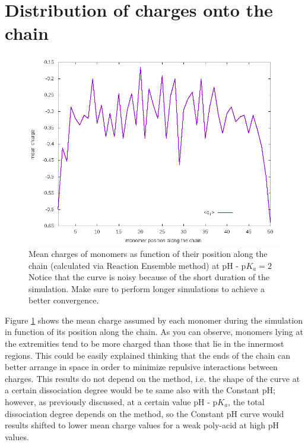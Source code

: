 \documentclass[
a4paper,                        %
11pt,                           %
twoside,                        %
footsepline,                    %
headsepline,                    %
headexclude,                    %
footexclude,                    %
pagesize,                       %
]{scrartcl}
\begin{document}
\section{Distribution of charges onto the chain}

\begin{figure}[h]
	\centering
	\includegraphics[scale=0.5]{figures/qdistrib.png}
	\caption{Mean charges of monomers as function of their position along the chain (calculated via Reaction Ensemble method) at $\text{pH - p}K_a = 2$ Notice that the curve is noisy because of the short duration of the simulation. Make sure to perform longer simulations to achieve a better convergence.}
	\label{qdistrib}
\end{figure}
Figure \ref{qdistrib} shows the mean charge assumed by each monomer during the simulation in function of its position along the chain. As you can observe, monomers lying at the extremities tend to be more charged than those that lie in the innermost regions. This could be easily explained thinking that the ends of the chain can better arrange in space in order to minimize repulsive interactions between charges. This results do not depend on the method, i.e. the shape of the curve at a certain dissociation degree would be te same also with the Constant pH; however, as previously discussed, at a certain value $\text{pH - p}K_a$, the total dissociation degree depends on the method, so the Constant pH curve would results shifted to lower mean charge values for a weak poly-acid at high pH values.



\end{document}
